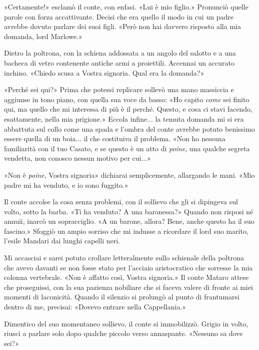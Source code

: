 «Certamente!» esclamò il conte, con enfasi. «Lui è mio figlio.»
Pronunciò quelle parole con forza accattivante. Decisi che era quello il
modo in cui un padre avrebbe dovuto parlare dei suoi figli. «Però non
hai davvero risposto alla mia domanda, lord Marlowe.»

Dietro la poltrona, con la schiena addossata a un angolo del salotto e a
una bacheca di vetro contenente antiche armi a proiettili. Accennai un
accurato inchino. «Chiedo scusa a Vostra signoria. Qual era la domanda?»

«Perché sei qui?» Prima che potessi replicare sollevò una mano massiccia
e aggiunse in tono piano, con quella sua voce da basso: «Ho capito
\emph{come} sei finito qui, ma quello che mi interessa di più è il
perché. Questo, e cosa ci stavi facendo, esattamente, nella mia
prigione.» Eccola infine... la temuta domanda mi si era abbattuta sul
collo come una spada e l'ombra del conte avrebbe potuto benissimo essere
quella di un boia... il che costituiva il problema. «Non ho nessuna
familiarità con il tuo Casato, e se questo è un atto di \emph{poine},
una qualche segreta vendetta, non conosco nessun motivo per cui...»

«Non è \emph{poine}, Vostra signoria» dichiarai semplicemente,
allargando le mani. «Mio padre mi ha venduto, e io sono fuggito.»

Il conte accolse la cosa senza problemi, con il sollievo che gli si
dipingeva sul volto, sotto la barba. «Ti ha venduto? A una baronessa?»
Quando non risposi né annuii, inarcò un sopracciglio. «A un barone,
allora? Bene, anche questo ha il suo fascino.» Sfoggiò un ampio sorriso
che mi indusse a ricordare il lord suo marito, l'esile Mandari dai
lunghi capelli neri.

Mi accasciai e sarei potuto crollare letteralmente sullo schienale della
poltrona che avevo davanti se non fosse stato per l'acciaio
aristocratico che sorresse la mia colonna vertebrale. «Non è affatto
così, Vostra signoria.» Il conte Mataro attese che proseguissi, con la
sua pazienza nobiliare che si faceva valere di fronte ai miei momenti di
laconicità. Quando il silenzio si prolungò al punto di frantumarsi
dentro di me, precisai: «Dovevo entrare nella Cappellania.»

Dimentico del suo momentaneo sollievo, il conte si immobilizzò. Grigio
in volto, riuscì a parlare solo dopo qualche piccolo verso annaspante.
«Nessuno sa dove sei?»

